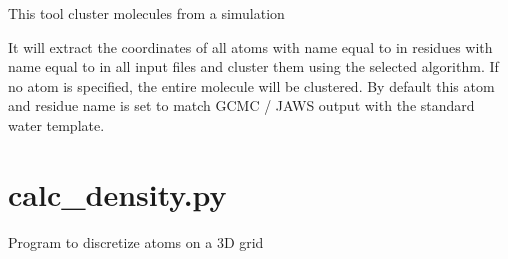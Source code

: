 \documentclass[letterpaper,10pt,english]{sphinxmanual}
\begin{document}

This tool cluster molecules from a simulation

It will extract the coordinates of all atoms with name equal to  in residues with name equal to  in all input files and cluster them using the selected algorithm.  If no atom is specified, the entire molecule will be clustered. By default this atom and residue name is set to match GCMC / JAWS output with the standard water template.


\section{calc\_density.py}
\label{\detokenize{tools:calc-density-py}}

Program to discretize atoms on a 3D grid


%
\begin{sphinxVerbatim}[commandchars=\\\{\}]
  \PYG{p}{[}\PYG{p}{]} \PYG{p}{[}  \PYG{p}{[} \PYG{p}{]}\PYG{p}{]} \PYG{p}{[} \PYG{p}{]} \PYG{p}{[} \PYG{p}{]}
                       \PYG{p}{[} \PYG{p}{]} \PYG{p}{[} \PYG{p}{]} \PYG{p}{[} \PYG{p}{]} \PYG{p}{[} \PYG{p}{]}
                       \PYG{p}{[} \PYG{p}{]} \PYG{p}{[} \PYG{p}{]} \PYG{p}{[} \PYG{p}{]}
                       \PYG{p}{[} \PYG{p}{]}
\end{sphinxVerbatim}
\end{document}
